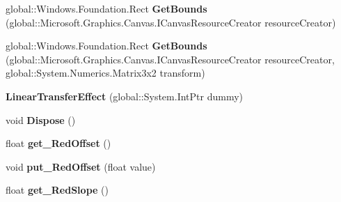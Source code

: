 \begin{DoxyCompactItemize}
global\+::\+Windows.\+Foundation.\+Rect {\bfseries Get\+Bounds} (global\+::\+Microsoft.\+Graphics.\+Canvas.\+I\+Canvas\+Resource\+Creator resource\+Creator)
\item 
\mbox{\label{class_microsoft_1_1_graphics_1_1_canvas_1_1_effects_1_1_linear_transfer_effect_a18b1ccc429d27cfdd87cfdc6d79203ee}} 
global\+::\+Windows.\+Foundation.\+Rect {\bfseries Get\+Bounds} (global\+::\+Microsoft.\+Graphics.\+Canvas.\+I\+Canvas\+Resource\+Creator resource\+Creator, global\+::\+System.\+Numerics.\+Matrix3x2 transform)
\item 
\mbox{\label{class_microsoft_1_1_graphics_1_1_canvas_1_1_effects_1_1_linear_transfer_effect_ab618808a7f44e9188b529ade14052be5}} 
{\bfseries Linear\+Transfer\+Effect} (global\+::\+System.\+Int\+Ptr dummy)
\item 
\mbox{\label{class_microsoft_1_1_graphics_1_1_canvas_1_1_effects_1_1_linear_transfer_effect_a6b4b889a528c6743eee4a283fe67892a}} 
void {\bfseries Dispose} ()
\item 
\mbox{\label{class_microsoft_1_1_graphics_1_1_canvas_1_1_effects_1_1_linear_transfer_effect_ac7da84c5d5faac56ac8c6beb8c935d23}} 
float {\bfseries get\+\_\+\+Red\+Offset} ()
\item 
\mbox{\label{class_microsoft_1_1_graphics_1_1_canvas_1_1_effects_1_1_linear_transfer_effect_a6d4d761ad4b3ae015d3724f417618963}} 
void {\bfseries put\+\_\+\+Red\+Offset} (float value)
\item 
\mbox{\label{class_microsoft_1_1_graphics_1_1_canvas_1_1_effects_1_1_linear_transfer_effect_a6dc37edf11a2d5e95fababcfe4795a5f}} 
float {\bfseries get\+\_\+\+Red\+Slope} ()
\item 
\mbox{\label{class_microsoft_1_1_graphics_1_1_canvas_1_1_effects_1_1_linear_transfer_effect_a878367955d22fb27da4bafaf3fdf6e75}} 

\end{DoxyCompactItemize}
